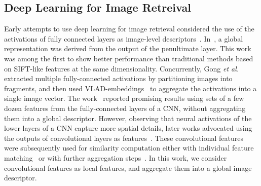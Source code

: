 \documentclass[journal]{IEEEtran}
\begin{document}
\subsection{Deep Learning for Image Retreival}
Early attempts to use deep learning for image retrieval considered the use of the activations of fully connected layers as image-level descriptors~\cite{babenko2014neural,razavian2014cnn,gong2014multi}.
In~\cite{babenko2014neural}, a global representation was derived from the output of the penultimate layer.
This work was among the first to show better performance than traditional methods based on SIFT-like features at the same dimensionality.
Concurrently, Gong \textit{et al.}~\cite{gong2014multi} extracted multiple fully-connected activations by partitioning images into fragments, and then used VLAD-embeddings~\cite{jegou2010aggregating} to aggregate the activations into a single image vector.
The work~\cite{razavian2014cnn} reported promising results using sets of a few dozen
features from the fully-connected layers of a CNN, without aggregating them into a global descriptor. However, observing that neural activations of the lower layers of a CNN capture more spatial details, later works advocated using the outputs of convolutional layers as features~\cite{babenko2015aggregating,kalantidis2016cross,hoang2017selective,tolias2016particular,azizpour2015generic,razavian2016visual,noh2017largescale,xu2018unsupervised, pang2018building}.
These convolutional features were subsequently used for similarity computation either with individual feature matching~\cite{noh2017largescale} or with further aggregation steps~\cite{babenko2015aggregating,kalantidis2016cross,hoang2017selective,tolias2016particular}.
In this work, we consider convolutional features as local features, and
aggregate them into a global image descriptor.
\end{document}

